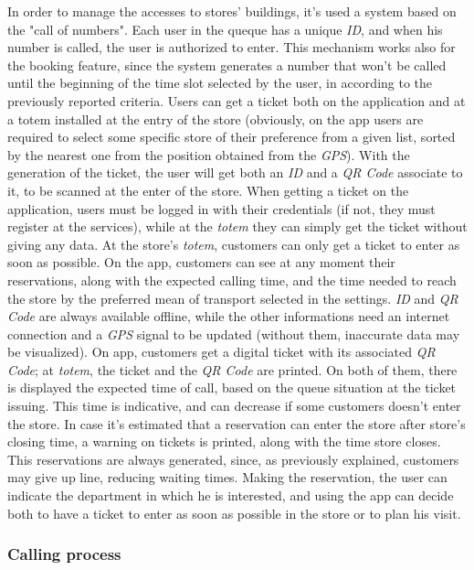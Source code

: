 \documentclass{article}
\begin{document}
		In order to manage the accesses to stores' buildings, it's used a system based on the "call of numbers". Each user in the queque has a unique \emph{ID}, and when his number is called, the user is authorized to enter. This mechanism works also for the booking feature, since the system generates a number that won't be called until the beginning of the time slot selected by the user, in according to the previously reported criteria. Users can get a ticket both on the application and at a totem installed at the entry of the store (obviously, on the app users are required to select some specific store of their preference from a given list, sorted by the nearest one from the position obtained from the \emph{GPS}). With the generation of the ticket, the user will get both an \emph{ID} and a \emph{QR Code} associate to it, to be scanned at the enter of the store. When getting a ticket on the application, users must be logged in with their credentials (if not, they must register at the services), while at the \emph{totem} they can simply get the ticket without giving any data. At the store's \emph{totem}, customers can only get a ticket to enter as soon as possible. On the app, customers can see at any moment their reservations, along with the expected calling time, and the time needed to reach the store by the preferred mean of transport selected in the settings. \emph{ID} and \emph{QR Code} are always available offline, while the other informations need an internet connection and a \emph{GPS} signal to be updated (without them, inaccurate data may be visualized). On app, customers get a digital ticket with its associated \emph{QR Code}; at \emph{totem}, the ticket and the \emph{QR Code} are printed. On both of them, there is displayed the expected time of call, based on the queue situation at the ticket issuing. This time is indicative, and can decrease if some customers doesn't enter the store. In case it's estimated that a reservation can enter the store after store's closing time, a warning on tickets is printed, along with the time store closes. This reservations are always generated, since, as previously explained, customers may give up line, reducing waiting times. Making the reservation, the user can indicate the department in which he is interested, and using the app can decide both to have a ticket to enter as soon as possible in the store or to plan his visit. 
		
		\subsubsection{Calling process}
		
\end{document}

